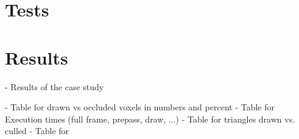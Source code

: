 %
%
%
%
%
%


\section{Tests}






\section{Results}

- Results of the case study

- Table for drawn vs occluded voxels in numbers and percent
- Table for Execution times (full frame, prepass, draw, ...)
- Table for triangles drawn vs. culled 
- Table for 
